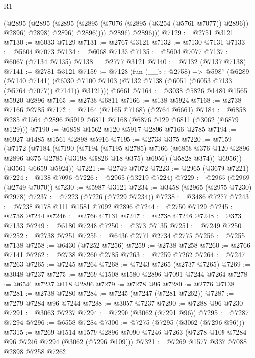 \begin{lexlean}{R1}
\begin{coremodule}
                  (@2895
                    (@2895
                      (@2895 (@2895 (@7076 (@2895 (@3254 (@5761 @7077)) @2896)) @2896) @2898)
                      @2896)
                    @2896))))
            @2896)
          @2896)))
@7129 := @2751 @3121
@7130 := @6033 @7129
@7131 := @2767 @3121
@7132 := @7130 @7131
@7133 := @5604 @7073
@7134 := @6068 @7133
@7135 := @5604 @7077
@7137 := @6067 (@7134 @7135)
@7138 := @2777 @3121
@7140 := @7132 (@7137 @7138)
@7141 := @2781 @3121
@7159 := @7128
    (fun (__b : @2758) =>
    @5987
      (@6289
        (@7140 @7141)
        (@6030 @7100 @7103 (@7132 @7138 (@6051 (@6053 @7133 (@5764 @7077)) @7141)) @3121)))
    @6661
@7164 := @3038 @6826 @1480 @1565 @5920 @2896
@7165 := @2738 @6811
@7166 := @138 @5924
@7168 := @2738 @7166 @2785
@7172 := @7164 (@7165 @7168) (@2764 @6661)
@7184 := @6858 @285 @1564 @2896 @5919 @6811 @7168 (@6876 @129 @6811 (@3062 (@6879 @129)))
@7190 := @6858 @1562 @120 @5917 @2896 @7166 @2785
@7194 := @6927 @1485 @1561 @2898 @5916
@7195 := @2738 @375
@7220 := @7159
    (@7172
      (@7184
        (@7190
          (@7194
            (@7195 @2785)
            @7166
            (@6858 @376 @120 @2896 @2896 @375 @2785 (@3198 @6826 @18 @375) @6956)
            (@5828 @374))
          @6956))
      (@3561 @6659 @5924))
@7221 := @2749 @7072
@7223 := @2965 (@3679 @7221)
@7224 := @138 @7096
@7226 := @2965 (@3219 @7224)
@7229 := @2965 (@2969 (@2749 @7070))
@7230 := @5987 @3121
@7234 := @3458 (@2965 (@2975 @7230) @2978)
@7237 := @7223 (@7226 (@7229 @7234))
@7238 := @3486 @7237
@7243 := @7238 @178 @111 @1581 @7092 @2896
@7244 := @2750 @7129
@7245 := @2738 @7244
@7246 := @2766 @7131
@7247 := @2738 @7246
@7248 := @373 @7133
@7249 := @5180 @7248
@7250 := @373 @7135
@7251 := @7249 @7250
@7252 := @2738 @7251
@7255 := @6436 @2771 @2734 @2775
@7256 := @7255 @7138
@7258 := @6430 (@7252 @7256)
@7259 := @2738 @7258
@7260 := @2766 @7141
@7262 := @2738 @7260 @2785
@7263 := @7259 @7262
@7264 := @7247 @7263
@7265 := @7245 @7264
@7268 := @7243 @7265 (@2737 @7265)
@7269 := @3048 @7237
@7275 := @7269 @1508 @1580 @2896 @7091 @7244 @7264
@7278 := @6540 @7237 @118 @2896
@7279 := @7278 @96
@7280 := @2776 @7138
@7281 := @2738 @7280
@7284 := @7245 (@7247 (@7281 @7262))
@7287 := @7279 @7284 @96 @7244
@7288 := @3057 @7237
@7290 := @7288 @96 @7230
@7291 := @3063 @7237
@7294 := @7290 (@3062 (@7291 @96))
@7295 := @7287 @7294
@7296 := @6558 @7284
@7300 := @7275 (@7295 (@3062 (@7296 @96)))
@7315 := @7269
    @1514
    @1579
    @2896
    @7090
    @7246
    @7263
    (@7278 @109 @7284 @96 @7246 @7294 (@3062 (@7296 @109)))
@7321 := @7269 @1577 @337 @7088 @2898 @7258 @7262

\end{coremodule}
\end{lexlean}
